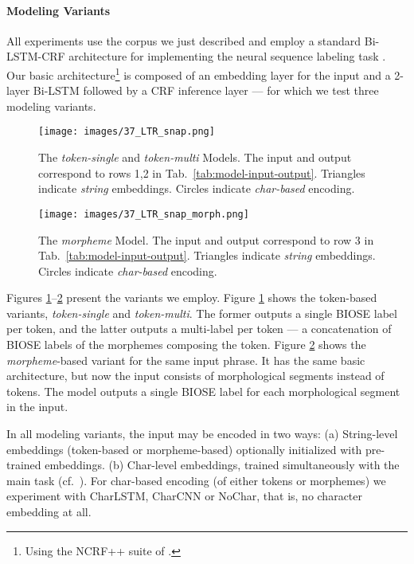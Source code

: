 \documentclass[11pt,a4paper]{article}
\newcommand{\TOKMACRO}{{\em token-single}\xspace}
\newcommand{\MULMACRO}{{\em token-multi}\xspace}
\newcommand{\MORMACRO}{{\em morpheme}\xspace}
\begin{document}
\paragraph{Modeling Variants}
All experiments  use the corpus we just described  and employ a standard Bi-LSTM-CRF  architecture  for implementing the  neural sequence labeling task \cite{DBLP:journals/corr/HuangXY15}.
Our basic architecture\footnote{Using the NCRF++ suite of    \citet{yang2018ncrf}.} is composed of an embedding layer for the input 
and a 2-layer Bi-LSTM followed by a CRF inference layer --- for which we test three modeling variants. 


\begin{figure}[t]
\centering
  \texttt{[image: images/37\_LTR\_snap.png]}
\caption{\label{fig:token-model} 
  The \TOKMACRO and \MULMACRO Models. The input and output correspond to rows 1,2 in Tab.\ \ref{tab:model-input-output}. Triangles indicate   {\em string} embeddings. Circles indicate   {\em char-based} encoding.}
\end{figure}

\begin{figure}[t]
\centering
  \texttt{[image: images/37\_LTR\_snap\_morph.png]}
\caption{\label{fig:morph-model} 
  The \MORMACRO Model. The input and output correspond to row 3 in Tab.\ \ref{tab:model-input-output}. Triangles indicate  {\em string} embeddings. Circles indicate   {\em char-based} encoding.}
\end{figure}



Figures \ref{fig:token-model}--\ref{fig:morph-model} present  the   variants we employ. 
Figure \ref{fig:token-model} shows   the token-based variants, \TOKMACRO and \MULMACRO.
The former outputs a single BIOSE  label per  token, and the latter 
 outputs a multi-label per token --- a concatenation of 
 BIOSE labels of the morphemes composing the  token. Figure \ref{fig:morph-model} shows the \MORMACRO-based variant for the same input phrase. It has the same basic architecture, but now the input consists of  morphological segments instead of tokens.  The model outputs a single BIOSE label for each morphological segment in the input.
 
 
In all modeling variants, the input may be encoded in two  ways: 
(a) String-level embeddings (token-based or morpheme-based) optionally initialized with pre-trained embeddings.
(b) Char-level embeddings, trained simultaneously with the main task 
(cf.\ \citet{DBLP:journals/corr/MaH16,DBLP:journals/corr/ChiuN15,DBLP:journals/corr/LampleBSKD16}). 
For char-based encoding (of either tokens or morphemes) we experiment with CharLSTM,  CharCNN or NoChar, that is, no character embedding at all.
 
\end{document}
